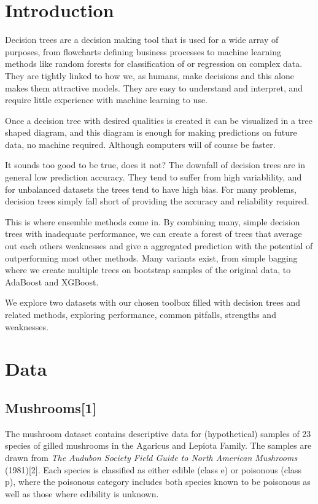 \documentclass[11pt]{article}
\begin{document}
    \hypertarget{introduction}{%
\section{Introduction}\label{introduction}}
Decision trees are a decision making tool that is used for a wide array of purposes, from flowcharts defining business processes to machine learning methods like random forests for classification of or regression on complex data. They are tightly linked to how we, as humans, make decisions and this alone makes them attractive models. They are easy to understand and interpret, and require little experience with machine learning to use. 

Once a decision tree with desired qualities is created it can be visualized in a tree shaped diagram, and this diagram is enough for making predictions on future data, no machine required. Although computers will of course be faster.

It sounds too good to be true, does it not? The downfall of decision trees are in general low prediction accuracy. They tend to suffer from high variablility, and for unbalanced datasets the trees tend to have high bias. For many problems, decision trees simply fall short of providing the accuracy and reliability required.

This is where ensemble methods come in. By combining many, simple decision trees with inadequate performance, we can create a forest of trees that average out each others weaknesses and give a aggregated prediction with the potential of outperforming most other methods. Many variants exist, from simple bagging where we create multiple trees on bootstrap samples of the original data, to AdaBoost and XGBoost. 

We explore two datasets with our chosen toolbox filled with decision trees and related methods, exploring performance, common pitfalls, strengths and weaknesses.  
    

    \hypertarget{data}{%
\section{Data}\label{data}}

    \hypertarget{mushrooms}{%
\subsection{Mushrooms[1]}\label{mushrooms}}

The mushroom dataset contains descriptive data for (hypothetical)
samples of 23 species of gilled mushrooms in the Agaricus and Lepiota
Family. The samples are drawn from \emph{The Audubon Society Field Guide
to North American Mushrooms} (1981)[2]. Each species is classified as
either edible (class e) or poisonous (class p), where the poisonous
category includes both species known to be poisonous as well as those where edibility is unknown.
\end{document}
